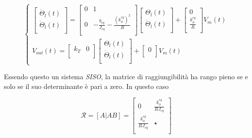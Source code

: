 	\begin{equation}
		\begin{cases}
			\begin{bmatrix}
				\dot{\Theta}_l(t)  \\
				\ddot{\Theta}_l(t) \\
			\end{bmatrix}
			=
			\begin{bmatrix}
				0 & 1                                  \\
				0 & -\frac{b_{eq}}{J_{eq}}-\frac{(k_{\phi}^{eq})^2}{R} \\
			\end{bmatrix}
			\begin{bmatrix}
				\Theta_l(t)       \\
				\dot{\Theta}_l(t) \\
			\end{bmatrix}	
			+
			\begin{bmatrix}
				0                       \\
				\frac{k_{\phi}^{eq}}{R} \\
			\end{bmatrix}
			V_m(t) \\
			V_{out}(t)=
			\begin{bmatrix}
				k_T & 0 \\
			\end{bmatrix}
			\begin{bmatrix}
				\Theta_l(t)       \\
				\dot{\Theta}_l(t) \\
			\end{bmatrix}
			+
			\begin{bmatrix}
				0 \\
			\end{bmatrix}
			V_m(t)											
		\end{cases}
	\end{equation}
		
	\noindent Essendo questo un sistema \textit{SISO}, la matrice di raggiungibilità ha rango pieno se e solo se il suo determinante è pari a zero. In questo caso
		
	\begin{equation}
		\mathcal{R}=[A|AB]=
		\begin{bmatrix}
			0 & \frac{k_{\phi}^{eq}}{RJ_{eq}} \\
			\frac{k_{\phi}^{eq}}{RJ_{eq}} & \star \\
		\end{bmatrix}
	\end{equation}
		
